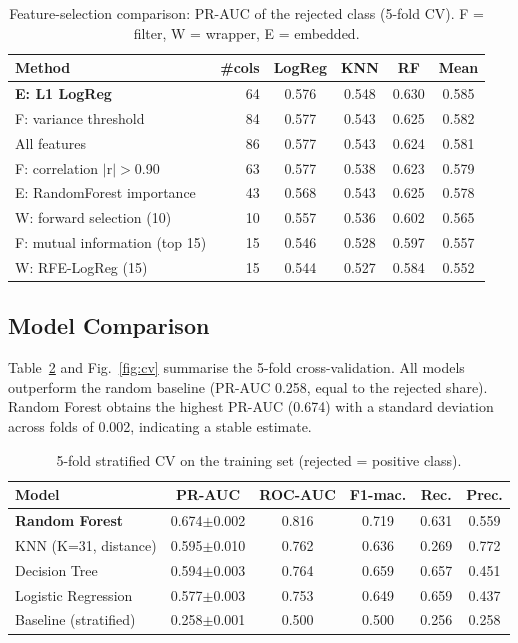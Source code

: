 \documentclass[conference]{IEEEtran}
\begin{document}
\begin{table}[!t]\centering
\caption{Feature-selection comparison: PR-AUC of the rejected class (5-fold CV). F = filter, W = wrapper, E = embedded.}\label{tab:fs}
\footnotesize\setlength{\tabcolsep}{3pt}
\begin{tabular}{lrcccc}\toprule
Method & \#cols & LogReg & KNN & RF & Mean \\\midrule
\textbf{E: L1 LogReg} & 64 & 0.576 & 0.548 & 0.630 & 0.585 \\
F: variance threshold & 84 & 0.577 & 0.543 & 0.625 & 0.582 \\
All features & 86 & 0.577 & 0.543 & 0.624 & 0.581 \\
F: correlation $|$r$|$$>$0.90 & 63 & 0.577 & 0.538 & 0.623 & 0.579 \\
E: RandomForest importance & 43 & 0.568 & 0.543 & 0.625 & 0.578 \\
W: forward selection (10) & 10 & 0.557 & 0.536 & 0.602 & 0.565 \\
F: mutual information (top 15) & 15 & 0.546 & 0.528 & 0.597 & 0.557 \\
W: RFE-LogReg (15) & 15 & 0.544 & 0.527 & 0.584 & 0.552 \\
\bottomrule\end{tabular}\end{table}

\subsection{Model Comparison}
Table~\ref{tab:cv} and Fig.~\ref{fig:cv} summarise the 5-fold cross-validation. All models outperform the random baseline (PR-AUC 0.258, equal to the rejected share). Random Forest obtains the highest PR-AUC (0.674)  with a standard deviation across folds of 0.002, indicating a stable estimate.

\begin{table}[!t]\centering
\caption{5-fold stratified CV on the training set (rejected = positive class).}\label{tab:cv}
\footnotesize\setlength{\tabcolsep}{2.5pt}
\begin{tabular}{lccccc}\toprule
Model & PR-AUC & ROC-AUC & F1-mac. & Rec. & Prec. \\\midrule
\textbf{Random Forest} & 0.674$\pm$0.002 & 0.816 & 0.719 & 0.631 & 0.559 \\
KNN (K=31, distance) & 0.595$\pm$0.010 & 0.762 & 0.636 & 0.269 & 0.772 \\
Decision Tree & 0.594$\pm$0.003 & 0.764 & 0.659 & 0.657 & 0.451 \\
Logistic Regression & 0.577$\pm$0.003 & 0.753 & 0.649 & 0.659 & 0.437 \\
Baseline (stratified) & 0.258$\pm$0.001 & 0.500 & 0.500 & 0.256 & 0.258 \\
\bottomrule\end{tabular}\end{table}
\end{document}
